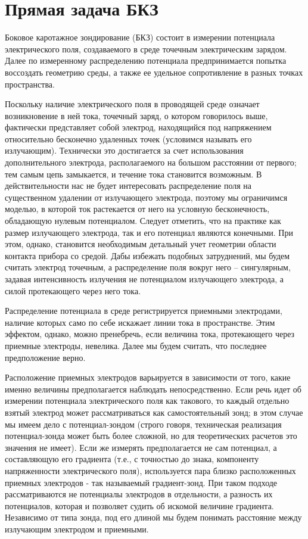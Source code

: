 \section{Прямая задача БКЗ}

Боковое каротажное зондирование (БКЗ) состоит в измерении
потенциала электрического поля, создаваемого в среде точечным электрическим зарядом.
Далее по измеренному распределению потенциала предпринимается попытка воссоздать
геометрию среды, а также ее удельное сопротивление в разных точках пространства.

Поскольку наличие электрического поля в проводящей среде означает
возникновение в ней тока, точечный заряд, о котором говорилось выше, фактически
представляет собой электрод, находящийся под напряжением относительно бесконечно
удаленных точек (условимся называть его излучающим). Технически это достигается за
счет использования дополнительного электрода, располагаемого на большом расстоянии от
первого; тем самым цепь замыкается, и течение тока становится возможным. В
действительности нас не будет интересовать распределение поля на существенном
удалении от излучающего электрода, поэтому мы ограничимся моделью, в которой ток
растекается от него на условную бесконечность, обладающую нулевым потенциалом.
Следует отметить, что на практике как размер излучающего электрода, так и его потенциал
являются конечными. При этом, однако, становится необходимым детальный учет
геометрии области контакта прибора со средой. Дабы избежать подобных затруднений, мы
будем считать электрод точечным, а распределение поля вокруг него – сингулярным,
задавая интенсивность излучения не потенциалом излучающего электрода, а силой
протекающего через него тока.

Распределение потенциала в среде регистрируется приемными электродами,
наличие которых само по себе искажает линии тока в пространстве. Этим эффектом,
однако, можно пренебречь, если величина тока, протекающего через приемные электроды,
невелика. Далее мы будем считать, что последнее предположение верно.

Расположение приемных электродов варьируется в зависимости от того, какие
именно величины предполагается наблюдать непосредственно. Если речь идет об
измерении потенциала электрического поля как такового, то каждый отдельно взятый
электрод может рассматриваться как самостоятельный зонд; в этом случае мы имеем дело
с потенциал-зондом (строго говоря, техническая реализация потенциал-зонда может быть
более сложной, но для теоретических расчетов это значения не имеет). Если же измерять
предполагается не сам потенциал, а составляющую его градиента (т.е., с точностью до
знака, компоненту напряженности электрического поля), используется пара близко
расположенных приемных электродов - так называемый градиент-зонд. При таком подходе
рассматриваются не потенциалы электродов в отдельности, а разность их потенциалов,
которая и позволяет судить об искомой величине градиента. Независимо от типа зонда, под
его длиной мы будем понимать расстояние между излучающим электродом и приемными.

